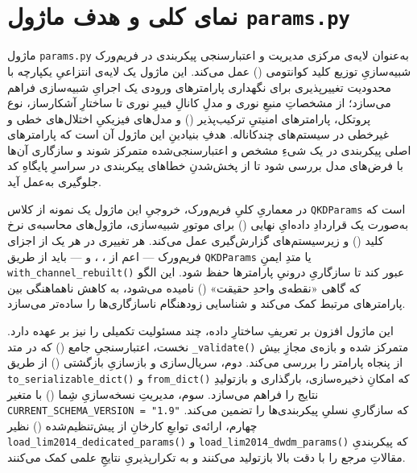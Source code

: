 

\section{نمای کلی و هدف ماژول \texttt{params.py}}

ماژول \texttt{params.py} به‌عنوان لایه‌ی مرکزی مدیریت و اعتبارسنجی پیکربندی در فریم‌ورک شبیه‌سازیِ توزیع کلید کوانتومی () عمل می‌کند. این ماژول یک لایه‌ی انتزاعیِ یکپارچه با محدودیت تغییرپذیری برای نگهداری پارامترهای ورودی یک اجرایِ شبیه‌سازی فراهم می‌سازد؛ از مشخصاتِ منبعِ نوری و مدلِ کانالِ فیبرِ نوری تا ساختارِ آشکارساز، نوع پروتکل، پارامترهای امنیتیِ ترکیب‌پذیر () و مدل‌های فیزیکیِ اختلال‌های خطی و غیرخطی در سیستم‌های چندکاناله. هدفِ بنیادینِ این ماژول آن است که پارامترهای اصلی پیکربندی در یک شیءِ مشخص و اعتبارسنجی‌شده متمرکز شوند و سازگاری آن‌ها با فرض‌های مدل بررسی شود تا از پخش‌شدنِ خطاهای پیکربندی در سراسرِ پایگاهِ کد جلوگیری به‌عمل آید.

در معماریِ کلیِ فریم‌ورک، خروجیِ این ماژول یک نمونه از کلاس \texttt{QKDParams} است که به‌صورت یک قراردادِ داده‌ایِ نهایی () برای موتورِ شبیه‌سازی، ماژول‌های محاسبه‌ی نرخ کلید () و زیرسیستم‌های گزارش‌گیری عمل می‌کند. هر تغییری در هر یک از اجزای فریم‌ورک — اعم از ، ،  و  — باید از طریق \texttt{QKDParams} یا متدِ ایمنِ \texttt{with\_channel\_rebuilt()} عبور کند تا سازگاریِ درونیِ پارامترها حفظ شود. این الگو که گاهی «نقطه‌ی واحدِ حقیقت» () نامیده می‌شود، به کاهش ناهماهنگی بین پارامترهای مرتبط کمک می‌کند و شناسایی زودهنگام ناسازگاری‌ها را ساده‌تر می‌سازد.

این ماژول افزون بر تعریفِ ساختارِ داده، چند مسئولیت تکمیلی را نیز بر عهده دارد. نخست، اعتبارسنجیِ جامع () که در متد \texttt{\_validate()} متمرکز شده و بازه‌ی مجازِ بیش از پنجاه پارامتر را بررسی می‌کند. دوم، سریال‌سازی و بازسازیِ بازگشتی () از طریق \texttt{to\_serializable\_dict()} و \texttt{from\_dict()} که امکانِ ذخیره‌سازی، بارگذاری و بازتولیدِ نتایج را فراهم می‌سازد. سوم، مدیریتِ نسخه‌سازیِ شِما () با متغیر \texttt{CURRENT\_SCHEMA\_VERSION = "1.9"} که سازگاریِ نسلیِ پیکربندی‌ها را تضمین می‌کند. چهارم، ارائه‌ی توابعِ کارخانِ از پیش‌تنظیم‌شده () نظیر \texttt{load\_lim2014\_dedicated\_params()} و \texttt{load\_lim2014\_dwdm\_params()} که پیکربندیِ مقالاتِ مرجع را با دقت بالا بازتولید می‌کنند و به تکرارپذیریِ نتایجِ علمی کمک می‌کنند.

